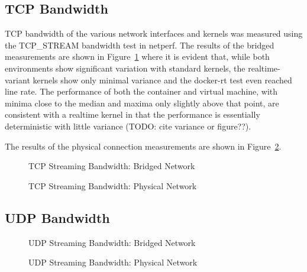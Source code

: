 \subsection{TCP Bandwidth} %
\label{sub:tcpbandwidth}
TCP bandwidth of the various network interfaces and kernels was measured using the TCP\_STREAM bandwidth test in netperf.
The results of the bridged measurements are shown in Figure~\ref{fig:tcp_stream_bridge} where it is evident that, while both environments show significant variation with standard kernels, the realtime-variant kernels show only minimal variance and the docker-rt test even reached line rate.
The performance of both the container and virtual machine, with minima close to the median and maxima only slightly above that point, are consistent with a realtime kernel in that the performance is essentially deterministic with little variance (TODO: cite variance or figure??).

The results of the physical connection measurements are shown in Figure~\ref{fig:tcp_stream_phys}.
\begin{figure}
    \centering
    \def\svgwidth{\columnwidth}
    
    \caption{TCP Streaming Bandwidth: Bridged Network}
    \label{fig:tcp_stream_bridge}
\end{figure}
\begin{figure}
    \centering
    \def\svgwidth{\columnwidth}
    
    \caption{TCP Streaming Bandwidth: Physical Network}
    \label{fig:tcp_stream_phys}
\end{figure}

\subsection{UDP Bandwidth} %
\label{sub:udpbandwidth}
\begin{figure}
    \centering
    \def\svgwidth{\columnwidth}
    
    \caption{UDP Streaming Bandwidth: Bridged Network}
    \label{fig:udp_stream_bridge}
\end{figure}
\begin{figure}
    \centering
    \def\svgwidth{\columnwidth}
    
    \caption{UDP Streaming Bandwidth: Physical Network}
    \label{fig:udp_stream_phys}
\end{figure}



